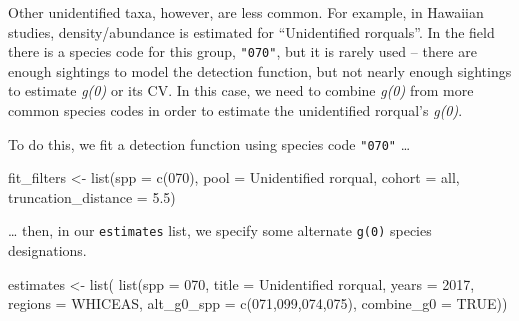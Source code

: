 \documentclass[
]{book}
\newenvironment{Shaded}{\begin{snugshade}}{\end{snugshade}}
\newcommand{\AttributeTok}[1]{\textcolor[rgb]{0.77,0.63,0.00}{#1}}
\newcommand{\ConstantTok}[1]{\textcolor[rgb]{0.00,0.00,0.00}{#1}}
\newcommand{\DecValTok}[1]{\textcolor[rgb]{0.00,0.00,0.81}{#1}}
\newcommand{\FloatTok}[1]{\textcolor[rgb]{0.00,0.00,0.81}{#1}}
\newcommand{\FunctionTok}[1]{\textcolor[rgb]{0.00,0.00,0.00}{#1}}
\newcommand{\NormalTok}[1]{#1}
\newcommand{\OtherTok}[1]{\textcolor[rgb]{0.56,0.35,0.01}{#1}}
\newcommand{\StringTok}[1]{\textcolor[rgb]{0.31,0.60,0.02}{#1}}
\begin{document}
Other unidentified taxa, however, are less common. For example, in Hawaiian studies, density/abundance is estimated for ``Unidentified rorquals''. In the field there is a species code for this group, \texttt{"070"}, but it is rarely used -- there are enough sightings to model the detection function, but not nearly enough sightings to estimate \emph{g(0)} or its CV. In this case, we need to combine \emph{g(0)} from more common species codes in order to estimate the unidentified rorqual's \emph{g(0)}.

To do this, we fit a detection function using species code \texttt{"070"} \ldots{}

\begin{Shaded}
\begin{Highlighting}[]
\NormalTok{fit\_filters }\OtherTok{\textless{}{-}}
    \FunctionTok{list}\NormalTok{(}\AttributeTok{spp =} \FunctionTok{c}\NormalTok{(}\StringTok{\textquotesingle{}070\textquotesingle{}}\NormalTok{),}
         \AttributeTok{pool =} \StringTok{\textquotesingle{}Unidentified rorqual\textquotesingle{}}\NormalTok{,}
         \AttributeTok{cohort =} \StringTok{\textquotesingle{}all\textquotesingle{}}\NormalTok{,}
         \AttributeTok{truncation\_distance =} \FloatTok{5.5}\NormalTok{)}
\end{Highlighting}
\end{Shaded}

\ldots{} then, in our \texttt{estimates} list, we specify some alternate \texttt{g(0)} species designations.

\begin{Shaded}
\begin{Highlighting}[]
\NormalTok{estimates }\OtherTok{\textless{}{-}} \FunctionTok{list}\NormalTok{(}
    \FunctionTok{list}\NormalTok{(}\AttributeTok{spp =} \StringTok{\textquotesingle{}070\textquotesingle{}}\NormalTok{,}
         \AttributeTok{title =} \StringTok{\textquotesingle{}Unidentified rorqual\textquotesingle{}}\NormalTok{,}
         \AttributeTok{years =} \DecValTok{2017}\NormalTok{,}
         \AttributeTok{regions =} \StringTok{\textquotesingle{}WHICEAS\textquotesingle{}}\NormalTok{,}
         \AttributeTok{alt\_g0\_spp =} \FunctionTok{c}\NormalTok{(}\StringTok{\textquotesingle{}071\textquotesingle{}}\NormalTok{,}\StringTok{\textquotesingle{}099\textquotesingle{}}\NormalTok{,}\StringTok{\textquotesingle{}074\textquotesingle{}}\NormalTok{,}\StringTok{\textquotesingle{}075\textquotesingle{}}\NormalTok{),}
         \AttributeTok{combine\_g0 =} \ConstantTok{TRUE}\NormalTok{))}
\end{Highlighting}
\end{Shaded}
\end{document}
